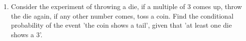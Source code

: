 \begin{enumerate}[label=\thechapter.\arabic*,ref=\thechapter.\theenumi]
\item Consider the experiment of throwing a die, if a multiple of 3 comes up, throw the die again, if any other number comes, toss a coin. Find the conditional probability of the event 'the coin shows a tail', given that 'at least one die shows a 3'.
\end{enumerate}
